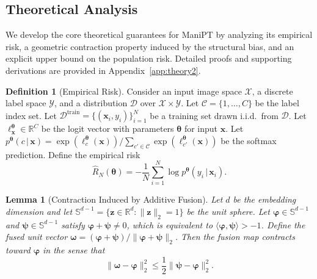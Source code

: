 \documentclass{article}
\theoremstyle{plain}
\newtheorem{lemma}[theorem]{Lemma}
\theoremstyle{definition}
\newtheorem{definition}[theorem]{Definition}
\theoremstyle{remark}
\begin{document}
	\subsection{Theoretical Analysis}
	\label{sec:theory_main}
	We develop the core theoretical guarantees for ManiPT by analyzing its empirical risk, a geometric contraction property induced by the structural bias, and an explicit upper bound on the population risk. Detailed proofs and supporting derivations are provided in Appendix~\ref{app:theory2}.
	\begin{definition}[Empirical Risk]\label{def:emp_risk}
		Consider an input image space $\mathcal{X}$, a discrete label space $\mathcal{Y}$, and a distribution $\mathcal{D}$ over $\mathcal{X}\times \mathcal{Y}$.
		Let $\mathcal{C}=\{1,\dots,C\}$ be the label index set.
		Let $\mathcal{D}^{\mathrm{train}}=\{(\mathbf{x}_i,y_i)\}_{i=1}^{N}$ be a training set drawn i.i.d.\ from $\mathcal{D}$.
		Let $\boldsymbol{\ell}^{\boldsymbol{\theta}}_{\mathbf{x}}\in\mathbb R^{C}$ be the logit vector with parameters $\boldsymbol{\theta}$ for input $\mathbf{x}$.
		Let $p^{\boldsymbol{\theta}}(c\,|\,\mathbf{x})=\exp(\ell^{\boldsymbol{\theta}}_c(\mathbf{x}))/\sum_{c'\in \mathcal{C}}\exp(\ell^{\boldsymbol{\theta}}_{c'}(\mathbf{x}))$ be the softmax prediction.
		Define the empirical risk
		\begin{equation*}
			\widehat R_{N}(\boldsymbol{\theta})
			=
			-\frac{1}{N}\sum_{i=1}^{N}\log p^{\boldsymbol{\theta}}(y_i\,|\,\mathbf{x}_i).
		\end{equation*}
	\end{definition}
	\begin{lemma}[Contraction Induced by Additive Fusion]\label{lem:contraction}
		Let $d$ be the embedding dimension and let $\mathbb S^{d-1}=\{\mathbf{z}\in\mathbb R^d:\|\mathbf{z}\|_2=1\}$ be the unit sphere.
		Let $\boldsymbol{\varphi}\in\mathbb S^{d-1}$ and $\boldsymbol{\psi}\in\mathbb S^{d-1}$ satisfy $\boldsymbol{\varphi}+\boldsymbol{\psi}\neq 0$, which is equivalent to $\langle \boldsymbol{\varphi},\boldsymbol{\psi}\rangle>-1$.
		Define the fused unit vector $\boldsymbol{\omega}=(\boldsymbol{\varphi}+\boldsymbol{\psi})/\|\boldsymbol{\varphi}+\boldsymbol{\psi}\|_2$.
		Then the fusion map contracts toward $\boldsymbol{\varphi}$ in the sense that
		\begin{equation*}
			\|\boldsymbol{\omega}-\boldsymbol{\varphi}\|_2^2 \le \frac12\|\boldsymbol{\psi}-\boldsymbol{\varphi}\|_2^2.
		\end{equation*}
	\end{lemma}
\end{document}
